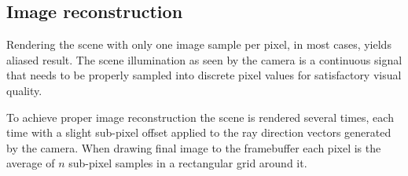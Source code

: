 \subsection{Image reconstruction}
Rendering the scene with only one image sample per pixel, in most cases, yields aliased result. The scene illumination as seen by the camera is a continuous signal that needs to be properly sampled into discrete pixel values for satisfactory visual quality.

To achieve proper image reconstruction the scene is rendered several times, each time with a slight sub-pixel offset applied to the ray direction vectors generated by the camera. When drawing final image to the framebuffer each pixel is the average of $n$ sub-pixel samples in a rectangular grid around it.
